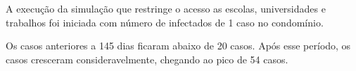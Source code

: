 A execução da simulação que restringe o acesso as escolas, universidades e trabalhos foi iniciada com número de infectados de 1 caso no condomínio. 



Os casos anteriores a 145 dias ficaram abaixo de 20 casos. Após esse período, os casos cresceram consideravelmente, chegando ao pico de 54 casos.



